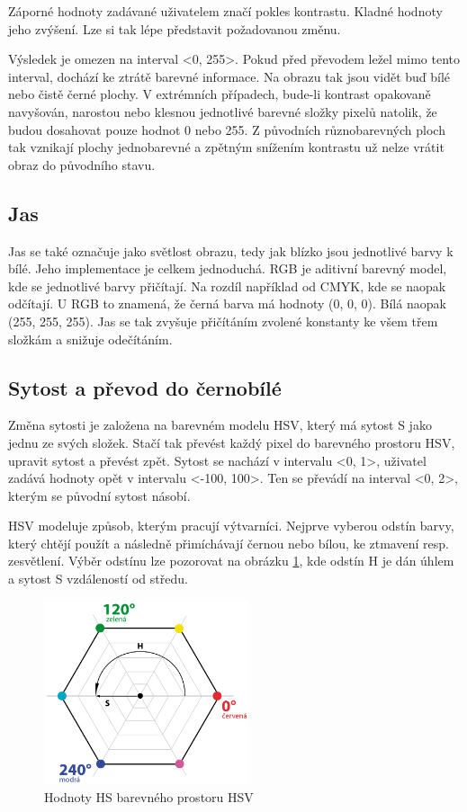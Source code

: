 \documentclass[11pt,twoside,a4paper]{book}
\begin{document}
\indent
Záporné hodnoty zadávané uživatelem značí pokles kontrastu. Kladné hodnoty jeho zvýšení. Lze si tak lépe představit požadovanou změnu.

\indent 
Výsledek je omezen na interval <0, 255>. Pokud před převodem ležel mimo tento interval, dochází ke ztrátě barevné informace. Na obrazu tak jsou vidět buď bílé nebo čistě černé plochy. V extrémních případech, bude-li kontrast opakovaně navyšován, narostou nebo klesnou jednotlivé barevné složky pixelů natolik, že budou dosahovat pouze hodnot 0 nebo 255. Z původních různobarevných ploch tak vznikají plochy jednobarevné a zpětným snížením kontrastu už nelze vrátit obraz do původního stavu.

\subsection{Jas}
\noindent
Jas se také označuje jako světlost obrazu, tedy jak blízko jsou jednotlivé barvy k bílé. Jeho implementace je celkem jednoduchá. RGB je aditivní barevný model, kde se jednotlivé barvy přičítají. Na rozdíl například od CMYK, kde se naopak odčítají. U RGB to znamená, že černá barva má hodnoty (0, 0, 0). Bílá naopak (255, 255, 255). Jas se tak zvyšuje přičítáním zvolené konstanty ke všem třem složkám a snižuje odečítáním.

\subsection{Sytost a převod do černobílé}
\noindent
Změna sytosti je založena na barevném modelu HSV, který má sytost S jako jednu ze svých složek. Stačí tak převést každý pixel do barevného prostoru HSV, upravit sytost a převést zpět. Sytost se nachází v intervalu <0, 1>, uživatel zadává hodnoty opět v intervalu <-100, 100>. Ten se převádí na interval <0, 2>, kterým se původní sytost násobí.

\indent
HSV modeluje způsob, kterým pracují výtvarníci. Nejprve vyberou odstín barvy, který chtějí použít a následně přimíchávají černou nebo bílou, ke ztmavení resp. zesvětlení. Výběr odstínu lze pozorovat na obrázku \ref{fig:hsv}, kde odstín H je dán úhlem a sytost S vzdáleností od středu.

\begin{figure}[ht]
\begin{center}
\includegraphics[width=6cm]{figures/hsv}
\caption{Hodnoty HS barevného prostoru HSV}
\label{fig:hsv}
\end{center}
\end{figure}
\end{document}
